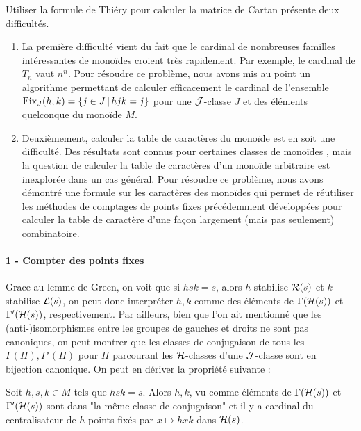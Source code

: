 \documentclass{article}
\begin{document}
	Utiliser la formule de Thiéry pour calculer la matrice de Cartan présente deux difficultés. 
	\begin{enumerate}
		\item La première difficulté vient du fait que le cardinal de nombreuses familles intéressantes de monoïdes croient très rapidement. Par exemple, le cardinal de $T_n$ vaut $n^n$. 
		Pour résoudre ce problème, nous avons mis au point un algorithme permettant de calculer efficacement le cardinal de l'ensemble $\operatorname{Fix}_J(h, k) = \{j \in J \,\vert\, hjk=j\}$ pour une $\mathcal{J}$-classe $J$ et des éléments quelconque du monoïde $M$.
		\item Deuxièmement, calculer la table de caractères du monoïde est en soit une difficulté. Des résultats sont connus pour certaines classes de monoïdes \cite[Section 9.4]{steinberg2016representation}, mais la question de calculer la table de caractères d'un monoïde arbitraire est inexplorée dans un cas général.
		Pour résoudre ce problème, nous avons démontré une formule sur les caractères des monoïdes qui permet de réutiliser les méthodes de comptages de points fixes précédemment développées pour calculer la table de caractère d'une façon largement (mais pas seulement) combinatoire.
	\end{enumerate}
	
	
	\paragraph{1 - Compter des points fixes}
	
	Grace au lemme de Green, on voit que si $hsk = s$, alors $h$ stabilise $\mathcal{R}(s)$ et $k$ stabilise $\mathcal{L}(s)$, on peut donc interpréter $h, k$ comme des éléments de $\Gamma(\mathcal{H}(s))$ et $\Gamma'(\mathcal{H}(s))$, respectivement. Par ailleurs, bien que l'on ait mentionné que les (anti-)isomorphismes entre les groupes de \schu gauches et droits ne sont pas canoniques, on peut montrer que les classes de conjugaison de tous les $\Gamma(H), \Gamma'(H)$ pour $H$ parcourant les $\mathcal{H}$-classes d'une $\mathcal{J}$-classe sont en bijection canonique. On peut en dériver la propriété suivante :
	\begin{prop}
		Soit $h, s, k \in M$ tels que $hsk=s$. Alors $h, k$, vu comme éléments de $\Gamma(\mathcal{H}(s))$ et $\Gamma'(\mathcal{H}(s))$ sont dans "la même classe de conjugaison" et il y a cardinal du centralisateur de $h$ points fixés par $x \mapsto hxk$ dans $\mathcal{H}(s)$.
	\end{prop}
	
\end{document}
